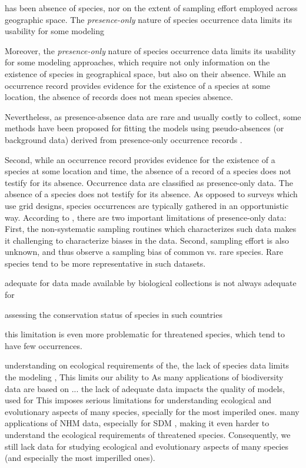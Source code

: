 has been absence of species, nor on the extent of sampling effort employed across geographic space.
The \textit{presence-only} nature of species occurrence data limits its usability for some modeling 

Moreover, the \textit{presence-only} nature of species occurrence data limits its usability for some modeling approaches, which require not only information on the existence of species in geographical space, but also on their absence.
While an occurrence record provides evidence for the existence of a species at some location, the absence of records does not mean species absence.

Nevertheless, as presence-absence data are rare and usually costly to collect, some methods have been proposed for fitting the models using pseudo-absences (or background data) derived from presence-only occurrence records \cite{Phillips2009}.

Second, while an occurrence record provides evidence for the existence of a species at some location and time, the absence of a record of a species does not testify for its absence.
Occurrence data are classified as presence-only data.
The absence of a species does not testify for its absence.
As opposed to surveys which use grid designs, species occurrences are typically gathered in an opportunistic way.
According to , there are two important limitations of presence-only data:
First, the non-systematic sampling routines which characterizes such data makes it challenging to characterize biases in the data. 
Second, sampling effort is also unknown, and thus observe a sampling bias of common vs. rare species.
Rare species tend to be more representative in such datasets.

adequate for data made available by biological collections is not always adequate for

assessing the conservation status of species in such countries



this limitation is even more problematic for threatened species, which tend to have few occurrences.

understanding on ecological requirements of the, the lack of species data limits the modeling , This limits our ability to 
As many applications of biodiversity data are based on ... the lack of adequate data impacts the quality of models, used for
This imposes serious limitations for understanding ecological and evolutionary aspects of many species, specially for the most imperiled ones. 
many applications of NHM data, especially for SDM \cite{Galante2017}, making it even harder to understand the ecological requirements of threatened species.
Consequently, we still lack data for studying ecological and evolutionary aspects of many species (and especially the most imperilled ones).

